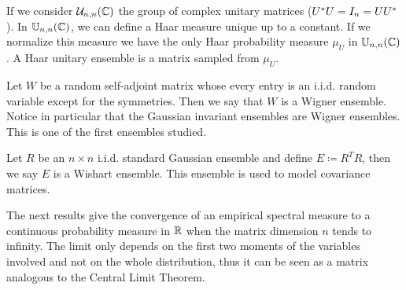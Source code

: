 \begin{example}
    If we consider $\mathcal U_{n,n}(\mathbb C)$ the group of complex unitary matrices ($U^*U = I_n = UU^*$). In $\mathbb U_{n,n}(\mathbb C)$, we can define a Haar measure unique up to a constant. If we normalize this measure we have the only Haar probability measure $\mu_U$ in $\mathbb U_{n,n}(\mathbb C)$. A Haar unitary ensemble is a matrix sampled from $\mu_U$.
\end{example}

\begin{example}
    Let $W$ be a random self-adjoint matrix whose every entry is an i.i.d. random variable except for the symmetries. Then we say that $W$ is a Wigner ensemble. Notice in particular that the Gaussian invariant ensembles are Wigner ensembles. This is one of the first ensembles studied.
\end{example}

\begin{example}
    Let $R$ be an $n\times n$ i.i.d. standard Gaussian ensemble and define $E \coloneqq R^T R$, then we say $E$ is a Wishart ensemble. This ensemble is used to model covariance matrices. 
\end{example}



The next results give the convergence of an empirical spectral measure to a continuous probability measure in $\mathbb R$ when the matrix dimension $n$ tends to infinity. The limit only depends on the first two moments of the variables involved and not on the whole distribution, thus it can be seen as a matrix analogous to the Central Limit Theorem.


